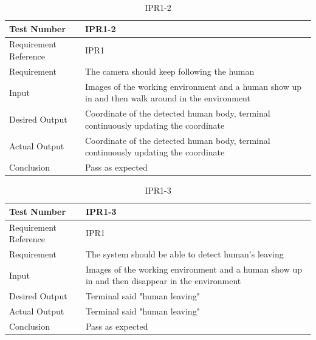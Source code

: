 \documentclass[12pt, titlepage]{article}
\begin{document}
\begin{table}[H]
\begin{center}
\begin{tabular}{|l | m{9cm}|}
\hline
  Test Number & IPR1-2\\
  \hline
  Requirement Reference & IPR1\\
  \hline
  Requirement &  The camera should keep following the human\\
  \hline
  Input & Images of the working environment and a human show up in and then walk around in
the environment\\
  \hline
  Desired Output & Coordinate of the detected human body, terminal continuously updating the coordinate\\
  \hline
  Actual Output & Coordinate of the detected human body, terminal continuously updating the coordinate\\
  \hline
  Conclusion & Pass as expected\\
  \hline
\end{tabular}
\end{center}
\caption{IPR1-2}
\end{table}

\begin{table}[H]
\begin{center}
\begin{tabular}{|l | m{9cm}|}
\hline
  Test Number & IPR1-3\\
  \hline
  Requirement Reference & IPR1\\
  \hline
  Requirement &  The system should be able to detect human's leaving\\
  \hline
  Input & Images of the working environment and a human show up in and then disappear in
the environment\\
  \hline
  Desired Output & Terminal said "human leaving"\\
  \hline
  Actual Output & Terminal said "human leaving"\\
  \hline
  Conclusion & Pass as expected\\
  \hline
\end{tabular}
\end{center}
\caption{IPR1-3}
\end{table}
\end{document}
